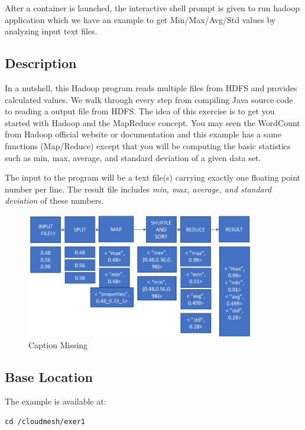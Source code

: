 After a container is launched, the interactive shell prompt is given
to run hadoop application which we have an example to get
Min/Max/Avg/Std values by analyzing input text files.

\subsection{Description}

In a nutshell, this Hadoop program reads multiple files from HDFS and
provides calculated values. We walk through every step from compiling
Java source code to reading a output file from HDFS\@. The idea of this
exercise is to get you started with Hadoop and the MapReduce
concept. You may seen the WordCount from Hadoop official website or
documentation and this example has a same functions (Map/Reduce)
except that you will be computing the basic statistics such as min,
max, average, and standard deviation of a given data set.

The input to the program will be a text file(s) carrying exactly one
floating point number per line. The result file includes \textit{min,
 max, average, and standard deviation} of these numbers.


\begin{figure}[!htbp]
 \includegraphics[width=0.9\textwidth]{section/container/images/docker-hadoop-1.png}
 \centering
 \caption{Caption Missing}
\end{figure}

\subsection{Base Location}

The example is available at:

\begin{lstlisting}
cd /cloudmesh/exer1
\end{lstlisting}

